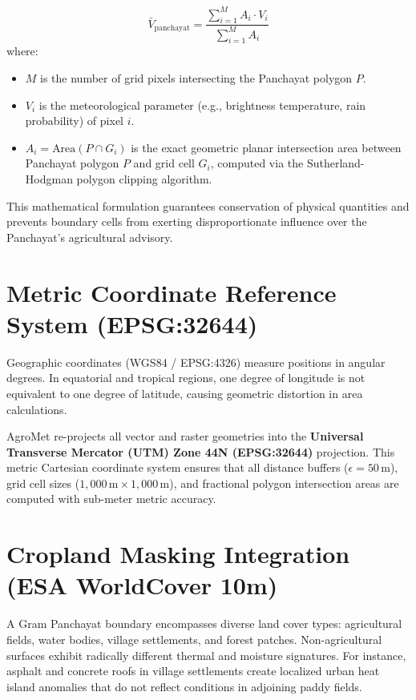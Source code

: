 \documentclass[11pt,a4paper,oneside]{report}
\begin{document}
\begin{equation}
\bar{V}_{\text{panchayat}} = \frac{\sum_{i=1}^M A_i \cdot V_i}{\sum_{i=1}^M A_i}
\end{equation}
where:
\begin{itemize}[leftmargin=*]
    \item $M$ is the number of grid pixels intersecting the Panchayat polygon $P$.
    \item $V_i$ is the meteorological parameter (e.g., brightness temperature, rain probability) of pixel $i$.
    \item $A_i = \text{Area}(P \cap G_i)$ is the exact geometric planar intersection area between Panchayat polygon $P$ and grid cell $G_i$, computed via the Sutherland-Hodgman polygon clipping algorithm.
\end{itemize}

This mathematical formulation guarantees conservation of physical quantities and prevents boundary cells from exerting disproportionate influence over the Panchayat's agricultural advisory.

\section{Metric Coordinate Reference System (EPSG:32644)}
Geographic coordinates (WGS84 / EPSG:4326) measure positions in angular degrees. In equatorial and tropical regions, one degree of longitude is not equivalent to one degree of latitude, causing geometric distortion in area calculations.

AgroMet re-projects all vector and raster geometries into the \textbf{Universal Transverse Mercator (UTM) Zone 44N (EPSG:32644)} projection. This metric Cartesian coordinate system ensures that all distance buffers ($\epsilon = 50\,\text{m}$), grid cell sizes ($1,000\,\text{m} \times 1,000\,\text{m}$), and fractional polygon intersection areas are computed with sub-meter metric accuracy.

\section{Cropland Masking Integration (ESA WorldCover 10m)}
A Gram Panchayat boundary encompasses diverse land cover types: agricultural fields, water bodies, village settlements, and forest patches. Non-agricultural surfaces exhibit radically different thermal and moisture signatures. For instance, asphalt and concrete roofs in village settlements create localized urban heat island anomalies that do not reflect conditions in adjoining paddy fields.
\end{document}
